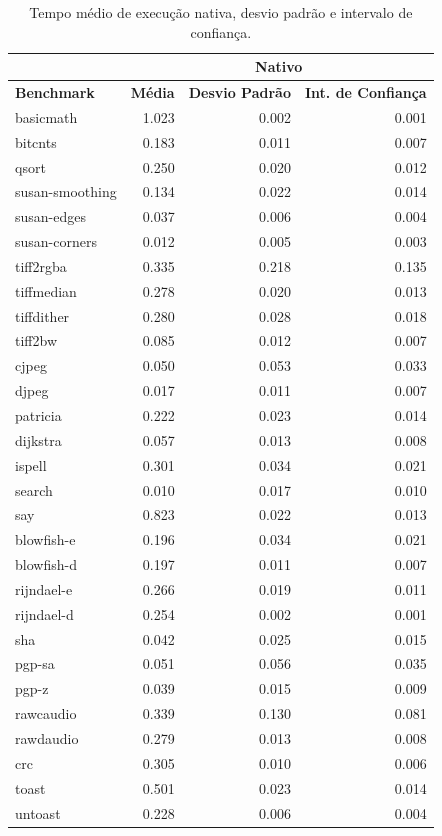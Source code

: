 \documentclass[11pt,twoside]{article}
\begin{document}
\begin{table}[!h]
 \caption{Tempo médio de execução nativa, desvio padrão e intervalo de confiança.}
 \begin{center}
 \begin{tabular}{|l|r|r|r|}
   \cline{2-4}
   \multicolumn{1}{c|}{}& \multicolumn{3}{|c|}{Nativo} \\ \hline
   \bf{Benchmark} & \bf{Média} & \bf{Desvio Padrão} & \bf{Int. de Confiança} \\ \hline
   basicmath & 1.023 & 0.002 & 0.001\\ \hline
   bitcnts & 0.183 & 0.011 & 0.007\\ \hline
   qsort & 0.250 & 0.020 & 0.012\\ \hline
   susan-smoothing & 0.134 & 0.022 & 0.014\\ \hline
   susan-edges & 0.037 & 0.006 & 0.004\\ \hline
   susan-corners & 0.012 & 0.005 & 0.003\\ \hline
   tiff2rgba & 0.335 & 0.218 & 0.135\\ \hline
   tiffmedian & 0.278 & 0.020 & 0.013\\ \hline 
   tiffdither & 0.280 & 0.028 & 0.018\\ \hline 
   tiff2bw & 0.085 & 0.012 & 0.007\\ \hline 
   cjpeg & 0.050 & 0.053 & 0.033\\ \hline 
   djpeg & 0.017 & 0.011 & 0.007\\ \hline 
   patricia & 0.222 & 0.023 & 0.014\\ \hline 
   dijkstra & 0.057 & 0.013 & 0.008\\ \hline 
   ispell & 0.301 & 0.034 & 0.021\\ \hline 
   search & 0.010 & 0.017 & 0.010\\ \hline 
   say & 0.823 & 0.022 & 0.013\\ \hline 
   blowfish-e & 0.196 & 0.034 & 0.021\\ \hline 
   blowfish-d & 0.197 & 0.011 & 0.007\\ \hline 
   rijndael-e & 0.266 & 0.019 & 0.011\\ \hline 
   rijndael-d & 0.254 & 0.002 & 0.001\\ \hline 
   sha & 0.042 & 0.025 & 0.015\\ \hline 
   pgp-sa & 0.051 & 0.056 & 0.035\\ \hline 
   pgp-z & 0.039 & 0.015 & 0.009\\ \hline 
   rawcaudio & 0.339 & 0.130 & 0.081\\ \hline 
   rawdaudio & 0.279 & 0.013 & 0.008\\ \hline 
   crc & 0.305 & 0.010 & 0.006\\ \hline 
   toast & 0.501 & 0.023 & 0.014\\ \hline 
   untoast & 0.228 & 0.006 & 0.004 \\
   \hline
  \end{tabular}
  \label{tab:tempos_nativo}
 \end{center}
\end{table}
\end{document}
